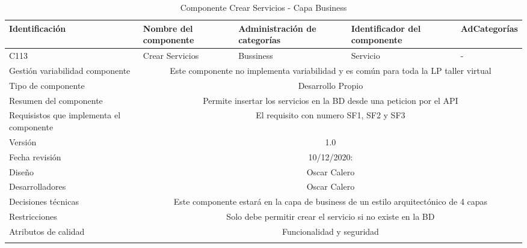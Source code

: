 \documentclass[10pt,a4paper,openany]{book}
\begin{document}
\begin{longtable}{|p{3cm}|p{3cm}|p{3cm}|p{3cm}|p{3cm}|} \hline
Identificación & Nombre del componente & Administración de categorías & Identificador del componente & AdCategorías \\[0.5ex] \hline
C113& Crear Servicios& Bussiness& Servicio& -\\[0.5ex] \hline
Gestión variabilidad componente & \multicolumn{4}{|c|}{Este componente no implementa variabilidad y es común para toda la LP taller virtual} \\ \hline
Tipo de componente & \multicolumn{4}{|c|}{Desarrollo Propio} \\ \hline
Resumen del componente & \multicolumn{4}{|c|}{Permite insertar los servicios en la BD desde una peticion por el API} \\ \hline
Requisistos que implementa el componente & \multicolumn{4}{|c|}{El requisito con numero SF1, SF2 y SF3 } \\ \hline
Versión & \multicolumn{4}{|c|}{1.0 } \\ \hline
Fecha revisión & \multicolumn{4}{|c|}{ 10/12/2020:} \\ \hline
Diseño & \multicolumn{4}{|c|}{Oscar Calero} \\ \hline
Desarrolladores & \multicolumn{4}{|c|}{Oscar Calero} \\ \hline
Decisiones técnicas & \multicolumn{4}{|c|}{Este componente estará en la capa de business de un estilo arquitectónico de 4 capas  } \\ \hline
Restricciones & \multicolumn{4}{|c|}{Solo debe permitir crear el servicio si no existe en la BD} \\ \hline
Atributos de calidad & \multicolumn{4}{|c|}{Funcionalidad y seguridad} \\ \hline
\caption{Componente Crear Servicios - Capa Business}
\label{table:t6}
\end{longtable}
\end{document}
